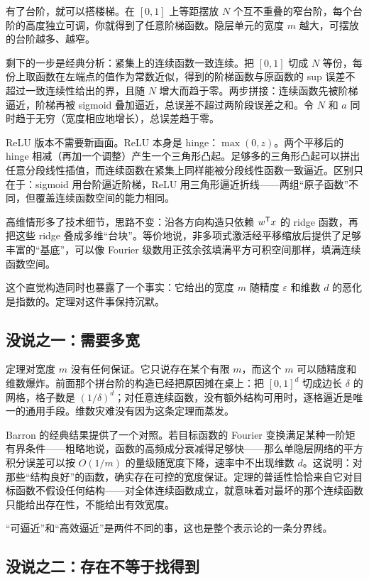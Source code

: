 有了台阶，就可以搭楼梯。在 \([0,1]\) 上等距摆放 \(N\) 个互不重叠的窄台阶，每个台阶的高度独立可调，你就得到了任意阶梯函数。隐层单元的宽度 \(m\) 越大，可摆放的台阶越多、越窄。

剩下的一步是经典分析：紧集上的连续函数一致连续。把 \([0,1]\) 切成 \(N\) 等份，每份上取函数在左端点的值作为常数近似，得到的阶梯函数与原函数的 sup 误差不超过一致连续性给出的界，且随 \(N\) 增大而趋于零。两步拼接：连续函数先被阶梯逼近，阶梯再被 sigmoid 叠加逼近，总误差不超过两阶段误差之和。令 \(N\) 和 \(a\) 同时趋于无穷（宽度相应地增长），总误差趋于零。

ReLU 版本不需要新画面。ReLU 本身是 hinge：\(\max(0,z)\)。两个平移后的 hinge 相减（再加一个调整）产生一个三角形凸起。足够多的三角形凸起可以拼出任意分段线性插值，而连续函数在紧集上同样能被分段线性函数一致逼近。区别只在于：sigmoid 用台阶逼近阶梯，ReLU 用三角形逼近折线——两组``原子函数''不同，但覆盖连续函数空间的能力相同。

高维情形多了技术细节，思路不变：沿各方向构造只依赖 \(w^{\mathsf{T}}x\) 的 ridge 函数，再把这些 ridge 叠成多维``台块''。等价地说，非多项式激活经平移缩放后提供了足够丰富的``基底''，可以像 Fourier 级数用正弦余弦填满平方可积空间那样，填满连续函数空间。

这个直觉构造同时也暴露了一个事实：它给出的宽度 \(m\) 随精度 \(\varepsilon\) 和维数 \(d\) 的恶化是指数的。定理对这件事保持沉默。

\subsection{没说之一：需要多宽}

定理对宽度 \(m\) 没有任何保证。它只说存在某个有限 \(m\)，而这个 \(m\) 可以随精度和维数爆炸。前面那个拼台阶的构造已经把原因摊在桌上：把 \([0,1]^d\) 切成边长 \(\delta\) 的网格，格子数是 \((1/\delta)^d\)；对任意连续函数，没有额外结构可用时，逐格逼近是唯一的通用手段。维数灾难没有因为这条定理而蒸发。

Barron 的经典结果提供了一个对照。若目标函数的 Fourier 变换满足某种一阶矩有界条件——粗略地说，函数的高频成分衰减得足够快——那么单隐层网络的平方积分误差可以按 \(O(1/m)\) 的量级随宽度下降，速率中不出现维数 \(d\)。这说明：对那些``结构良好''的函数，确实存在可控的宽度保证。定理的普适性恰恰来自它对目标函数不假设任何结构——对全体连续函数成立，就意味着对最坏的那个连续函数只能给出存在性，不能给出有效宽度。

``可逼近''和``高效逼近''是两件不同的事，这也是整个表示论的一条分界线。

\subsection{没说之二：存在不等于找得到}

